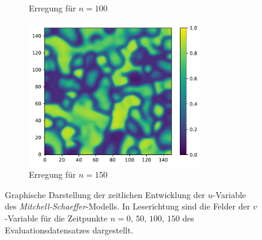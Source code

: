 \begin{appendices}
\begin{figure}[h]
\begin{subfigure}{.5\textwidth}
		\setcapmargin[1cm]{0.5cm}
		\caption{Erregung für $n=100$}
	\end{subfigure}%
	\begin{subfigure}{.5\textwidth}
		\centering
		\includegraphics[height=2.5in]{figures/results/dynamics/mitchell_150.pdf}
		\setcapmargin[1cm]{0.5cm}
		\caption{Erregung für $n=150$}
	\end{subfigure}
	\caption{Graphische Darstellung der zeitlichen Entwicklung der $u$-Variable des \textit{Mitchell-Schaeffer}-Modells. In Leserichtung sind die Felder der $v$-Variable für die Zeitpunkte $n=0,\, 50,\, 100,\, 150$ des Evaluationsdatensatzes dargestellt.}
	\label{fig:apx_mitchell_evolution}
\end{figure} 


\end{appendices}
